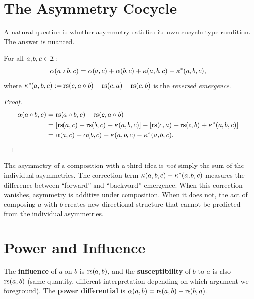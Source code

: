 \section{The Asymmetry Cocycle}

A natural question is whether asymmetry satisfies its own cocycle-type
condition. The answer is nuanced.

\begin{theorem}\label{thm:asym-emergence}
For all $a, b, c \in \mathcal{I}$:
\[
    \alpha(a \circ b, c) = \alpha(a, c) + \alpha(b, c) +
    \kappa(a, b, c) - \kappa^*(a, b, c),
\]
where $\kappa^*(a, b, c) := \mathrm{rs}(c, a \circ b) - \mathrm{rs}(c, a) - \mathrm{rs}(c, b)$
is the \emph{reversed emergence}.
\end{theorem}
\begin{proof}
\begin{align*}
    \alpha(a \circ b, c) &= \mathrm{rs}(a \circ b, c) - \mathrm{rs}(c, a \circ b) \\
    &= [\mathrm{rs}(a,c) + \mathrm{rs}(b,c) + \kappa(a,b,c)]
     - [\mathrm{rs}(c,a) + \mathrm{rs}(c,b) + \kappa^*(a,b,c)] \\
    &= \alpha(a,c) + \alpha(b,c) + \kappa(a,b,c) - \kappa^*(a,b,c).
\end{align*}
\end{proof}

\begin{interpretation}
The asymmetry of a composition with a third idea is \emph{not} simply
the sum of the individual asymmetries. The correction term
$\kappa(a,b,c) - \kappa^*(a,b,c)$ measures the difference between
``forward'' and ``backward'' emergence. When this correction vanishes,
asymmetry is additive under composition. When it does not, the act of
composing $a$ with $b$ creates new directional structure that cannot be
predicted from the individual asymmetries.
\end{interpretation}

\section{Power and Influence}

\begin{definition}[Influence]
The \textbf{influence} of $a$ on $b$ is $\mathrm{rs}(a, b)$, and the
\textbf{susceptibility} of $b$ to $a$ is also $\mathrm{rs}(a, b)$ (same quantity,
different interpretation depending on which argument we foreground).
The \textbf{power differential} is $\alpha(a, b) = \mathrm{rs}(a,b) - \mathrm{rs}(b,a)$.
\end{definition}

